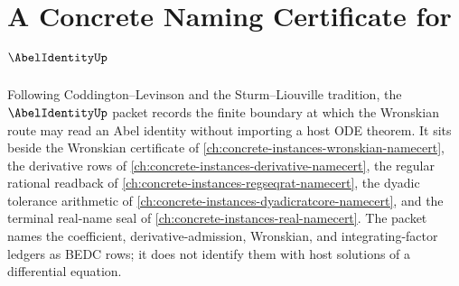 \chapter{A Concrete Naming Certificate for $\AbelIdentityUp$}
\label{ch:concrete-instances-abel-identity-namecert}

Following Coddington--Levinson and the Sturm--Liouville tradition, the $\AbelIdentityUp$ packet records the finite boundary at which the Wronskian route may read an Abel identity without importing a host ODE theorem. It sits beside the Wronskian certificate of \autoref{ch:concrete-instances-wronskian-namecert}, the derivative rows of \autoref{ch:concrete-instances-derivative-namecert}, the regular rational readback of \autoref{ch:concrete-instances-regseqrat-namecert}, the dyadic tolerance arithmetic of \autoref{ch:concrete-instances-dyadicratcore-namecert}, and the terminal real-name seal of \autoref{ch:concrete-instances-real-namecert}. The packet names the coefficient, derivative-admission, Wronskian, and integrating-factor ledgers as BEDC rows; it does not identify them with host solutions of a differential equation.


